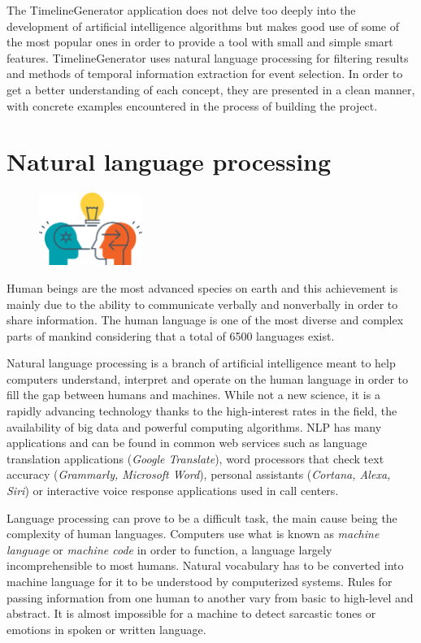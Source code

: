 \documentclass{report}
\begin{document}
The TimelineGenerator application does not delve too deeply into the development of artificial intelligence algorithms but makes good use of some of the most popular ones in order to provide a tool with small and simple smart features. TimelineGenerator uses natural language processing for filtering results and methods of temporal information extraction for event selection. In order to get a better understanding of each concept, they are presented in a clean manner, with concrete examples encountered in the process of building the project.

\section{Natural language processing}
\begin{figure}
	\vspace*{-1.5cm}
    \centering
    \includegraphics[width=0.3\textwidth]{nlp}
	\vspace{-10pt} 
\end{figure}
Human beings are the most advanced species on earth and this achievement is mainly due to the ability to communicate verbally and nonverbally in order to share information. The human language is one of the most diverse and complex parts of mankind considering that a total of 6500 languages exist.\par

Natural language processing is a branch of artificial intelligence meant to help computers understand, interpret and operate on the human language in order to fill the gap between humans and machines. While not a new science, it is a rapidly advancing technology thanks to the high-interest rates in the field, the availability of big data and powerful computing algorithms. NLP has many applications and can be found in common web services such as language translation applications (\textit{Google Translate}), word processors that check text accuracy (\textit{Grammarly, Microsoft Word}), personal assistants (\textit{Cortana, Alexa, Siri}) or interactive voice response applications used in call centers. \par

Language processing can prove to be a difficult task, the main cause being the complexity of human languages. Computers use what is known as \textit{machine language} or \textit{machine code} in order to function, a language largely incomprehensible to most humans. Natural vocabulary has to be converted into machine language for it to be understood by computerized systems. Rules for passing information from one human to another vary from basic to high-level and abstract. It is almost impossible for a machine to detect sarcastic tones or emotions in spoken or written language. \par
\end{document}
